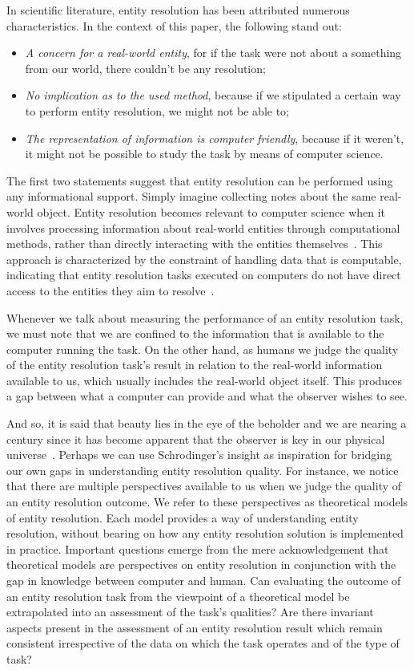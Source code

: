 In scientific literature, entity resolution has been attributed numerous
characteristics\cite{Tal11,Pap19}.
In the context of this paper, the following stand out:

\begin{itemize}
    \item\textit{A concern for a real-world entity}, for if the task were
    not about a something from our world, there couldn't be any resolution;
    \item\textit{No implication as to the used method}, because if we
    stipulated a certain way to perform entity resolution, we might not be
    able to;
    \item\textit{The representation of information is computer friendly},
    because if it weren't, it might not be possible to study the task by
    means of computer science.
\end{itemize}

The first two statements suggest that entity resolution can be performed
using any informational support.
Simply imagine collecting notes about the same real-world object.
Entity resolution becomes relevant to computer science when it involves
processing information about real-world entities through computational
methods, rather than directly interacting with the entities
themselves~\cite{Tal11}.
This approach is characterized by the constraint of handling data that is
computable, indicating that entity resolution tasks executed on computers
do not have direct access to the entities they aim to resolve~\cite{Chen09}.

Whenever we talk about measuring the performance of an entity resolution
task, we must note that we are confined to the information that is available
to the computer running the task.
On the other hand, as humans we judge the quality of the entity resolution
task's result in relation to the real-world information available to us, which
usually includes the real-world object itself.
This produces a gap between what a computer can provide and what the
observer wishes to see.

And so, it is said that beauty lies in the eye of the beholder and we are
nearing a century since it has become apparent that the observer is key in
our physical universe~\cite{schrodinger1926}.
Perhaps we can use Schrodinger's insight as inspiration for bridging our own
gaps in understanding entity resolution quality.
For instance, we notice that there are multiple perspectives available to us
when we judge the quality of an entity resolution outcome.
We refer to these perspectives as theoretical models of entity resolution.
Each model provides a way of understanding entity resolution, without bearing on
how any entity resolution solution is implemented in practice.
Important questions emerge from the mere acknowledgement that theoretical models
are perspectives on entity resolution in conjunction with the gap in knowledge
between computer and human.
Can evaluating the outcome of an entity resolution task from the viewpoint of a
theoretical model be extrapolated into an assessment of the task's qualities?
Are there invariant aspects present in the assessment of an entity resolution
result which remain consistent irrespective of the data on which the task
operates and of the type of task?

